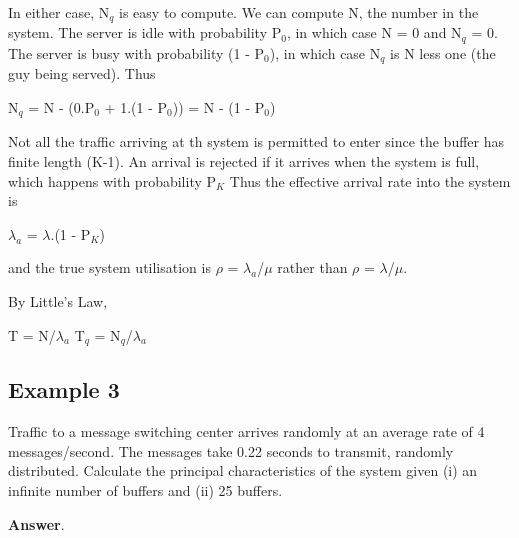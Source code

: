 \documentclass[12pt,fleqn]{report}
\begin{document}
In either case, N$_q$ is easy to compute.
We can compute N, the number in the system.
The server is idle with probability P$_0$,
in which case N = 0 and N$_q$ = 0.
The server is busy with probability (1 - P$_0$),
in which case N$_q$ is N less one (the guy being served).
Thus

\begin{center}
N$_q$ = N - (0.P$_0$ + 1.(1 - P$_0$)) = N - (1 - P$_0$)
\end{center}

Not all the traffic arriving at th system is permitted to
enter since the buffer has finite length (K-1).
An arrival is rejected if it arrives when the system is full,
which happens with probability P$_K$
Thus the effective arrival rate into the system is 

\begin{center}
$\lambda_a$ = $\lambda$.(1 - P$_K$)
\end{center}

\noindent
and the true system utilisation is $\rho$ = $\lambda_a$/$\mu$ rather 
than $\rho$ = $\lambda$/$\mu$.

By Little's Law,

\begin{center}
T = N/$\lambda_a$  \hspace*{1in} T$_q$ = N$_q$/$\lambda_a$
\end{center}


\subsection*{Example 3}

Traffic to a message switching center arrives randomly at an
average rate of 4 messages/second.
The messages take 0.22 seconds to transmit, randomly distributed.
Calculate the principal characteristics of the system 
given (i) an infinite number of buffers and (ii) 25 buffers.

\noindent
{\bf Answer}.
\end{document}
